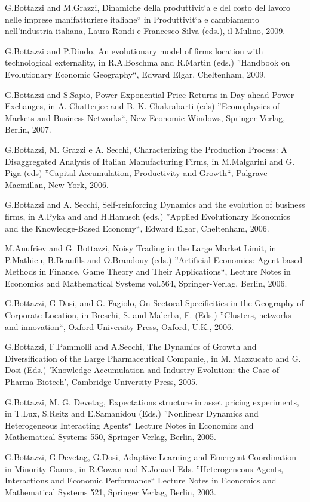 \documentclass[a4paper]{article}
\begin{document}
G.Bottazzi and M.Grazzi, Dinamiche della produttivit`a e del costo
del lavoro nelle imprese manifatturiere italiane`` in Produttivit`a e
cambiamento nell'industria italiana, Laura Rondi e Francesco Silva
(eds.), il Mulino, 2009.

G.Bottazzi and P.Dindo, An evolutionary model of firms location with
technological externality, in R.A.Boschma and R.Martin (eds.)
''Handbook on Evolutionary Economic Geography``, Edward Elgar,
Cheltenham, 2009.

G.Bottazzi and S.Sapio, Power Exponential Price Returns in Day-ahead
Power Exchanges, in A. Chatterjee and B. K. Chakrabarti (eds)
''Econophysics of Markets and Business Networks``, New Economic Windows,
Springer Verlag, Berlin, 2007.

G.Bottazzi, M. Grazzi e A. Secchi, Characterizing the Production
Process: A Disaggregated Analysis of Italian Manufacturing Firms, in
M.Malgarini and G. Piga (eds) ''Capital Accumulation, Productivity and
Growth``, Palgrave Macmillan, New York, 2006.

G.Bottazzi and A. Secchi, Self-reinforcing Dynamics and the evolution
of business firms, in A.Pyka and and H.Hanusch (eds.) ''Applied
Evolutionary Economics and the Knowledge-Based Economy``, Edward Elgar,
Cheltenham, 2006.

M.Anufriev and G. Bottazzi, Noisy Trading in the Large Market Limit,
in P.Mathieu, B.Beaufils and O.Brandouy (eds.)  ''Artificial Economics:
Agent-based Methods in Finance, Game Theory and Their Applications``,
Lecture Notes in Economics and Mathematical Systems vol.564,
Springer-Verlag, Berlin, 2006.

G.Bottazzi, G Dosi, and G. Fagiolo, On Sectoral Specificities in the
Geography of Corporate Location, in Breschi, S. and Malerba, F.
(Eds.) ''Clusters, networks and innovation``, Oxford University Press,
Oxford, U.K., 2006.

G.Bottazzi, F.Pammolli and A.Secchi, The Dynamics of Growth and
Diversification of the Large Pharmaceutical Companie,, in M.
Mazzucato and G.  Dosi (Eds.) 'Knowledge Accumulation and Industry
Evolution: the Case of Pharma-Biotech', Cambridge University Press,
2005.

G.Bottazzi, M. G. Devetag, Expectations structure in asset pricing
experiments, in T.Lux, S.Reitz and E.Samanidou (Eds.)  ''Nonlinear
Dynamics and Heterogeneous Interacting Agents`` Lecture Notes in
Economics and Mathematical Systems 550, Springer Verlag, Berlin, 2005.

G.Bottazzi, G.Devetag, G.Dosi, Adaptive Learning and Emergent
Coordination in Minority Games, in R.Cowan and N.Jonard Eds.
''Heterogeneous Agents, Interactions and Economic Performance`` Lecture
Notes in Economics and Mathematical Systems 521, Springer Verlag,
Berlin, 2003.
\end{document}
